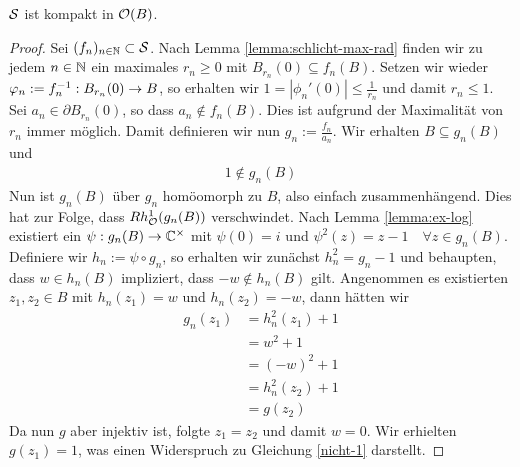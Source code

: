 \begin{thm}
  \label{thm:schlicht-kompakt}
  $\S$ ist kompakt in $\hol(B)$.
\end{thm}

\begin{proof}
  Sei $(f_n)_{n \in \N} \subset \S$.
  Nach Lemma \ref{lemma:schlicht-max-rad}  finden wir zu jedem $n \in \N$
  ein maximales $r_n \geq 0$ mit $B_{r_n}(0) \subseteq f_n(B)$. Setzen wir
  wieder $\phi_n:=f_n^{-1} : B_{r_n}(0) \ra B$, so erhalten wir $1 =
  |\phi_n'(0)| \leq \frac{1}{r_n}$ und damit $r_n \leq 1$. 
  Sei $a_n \in \partial B_{r_n}(0)$, so dass $a_n \notin f_n(B)$. Dies ist
  aufgrund der Maximalität von $r_n$ immer möglich. Damit definieren
  wir nun $g_n := \frac{f_n}{a_n}$. Wir erhalten $B \subseteq g_n(B)$
  und
  \begin{align}
  1 \notin g_n(B) \label{nicht-1}
  \end{align}
  Nun ist $g_n(B)$ über $g_n$ homöomorph zu $B$, also einfach
  zusammenhängend. Dies hat zur Folge, dass $Rh_\hol^1(g_n(B))$
  verschwindet. 
  Nach Lemma \ref{lemma:ex-log} existiert ein $\psi: g_n(B) \ra \C^\times$ mit
  $\psi(0) = i$ und $\psi^2(z) = z - 1 \quad \forall z \in g_n(B)$.
  Definiere wir $h_n := \psi \circ g_n$, so erhalten wir zunächst
  $h_n^2 = g_n - 1$ und behaupten, dass $w \in h_n(B)$ impliziert,
  dass $-w \notin h_n(B)$ gilt.
  Angenommen es existierten $z_1,z_2 \in B$ mit $h_n(z_1) = w$ und
  $h_n(z_2) = -w$, dann hätten wir
  \begin{align*}
    g_n(z_1) & = h_n^2(z_1) +1 \\
    & = w^2 +1 \\
    & = (-w)^2 +1 \\
    & = h_n^2(z_2) +1 \\
    & = g(z_2)
  \end{align*}
  Da nun $g$ aber injektiv ist, folgte $z_1 = z_2$ und damit $w =
  0$. Wir erhielten $g(z_1) = 1$, was einen Widerspruch zu Gleichung
  \eqref{nicht-1} darstellt. 


\end{proof}

